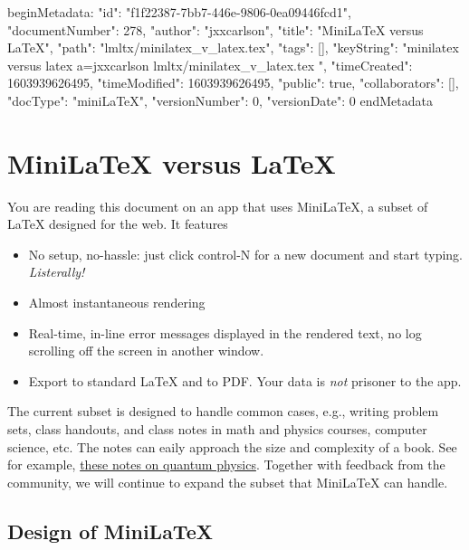 beginMetadata:
{
    "id": "f1f22387-7bb7-446e-9806-0ea09446fcd1",
    "documentNumber": 278,
    "author": "jxxcarlson",
    "title": "MiniLaTeX versus LaTeX",
    "path": "lmltx/minilatex_v_latex.tex",
    "tags": [],
    "keyString": "minilatex versus latex a=jxxcarlson lmltx/minilatex_v_latex.tex ",
    "timeCreated": 1603939626495,
    "timeModified": 1603939626495,
    "public": true,
    "collaborators": [],
    "docType": "miniLaTeX",
    "versionNumber": 0,
    "versionDate": 0
}
endMetadata

\setcounter{section}{4}

\section{MiniLaTeX versus LaTeX}



You are reading this document on an app that uses MiniLaTeX,  a subset of LaTeX designed for the web.  It features 

\begin{itemize}

\item No setup, no-hassle: just click control-N for a new document and start typing.  \emph{Listerally!}

\item Almost instantaneous rendering

\item Real-time, in-line error messages displayed in the rendered text, no log scrolling off the screen in another window.

\item Export to standard LaTeX and to PDF.  Your data is \emph{not} prisoner to the app.

\end{itemize}

The current subset is designed to handle common cases, e.g., writing problem sets, class handouts, and class notes in math and physics courses, computer science, etc.  The notes can eaily approach the size and complexity of a book.  See for example, \href{uuid:6f5a573d-5603-4470-8dc9-b0972997a6e6}{these  notes on quantum physics}.  Together with feedback from the community, we will continue to expand the subset that MiniLaTeX can handle.

\subsection*{Design of MiniLaTeX}

